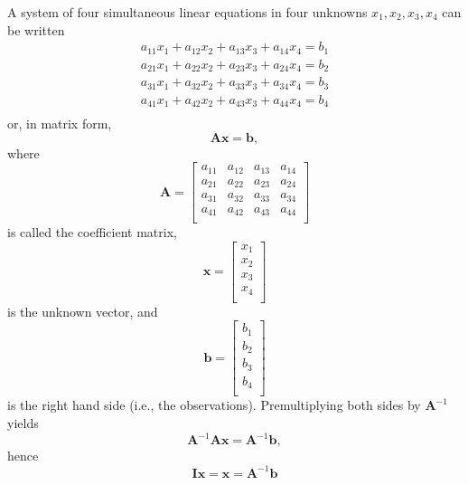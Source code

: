 A system of four simultaneous linear equations in four unknowns $x_1, x_2, x_3, x_4$ can be written
\begin{equation}
\begin{array}{c}
a_{11}x_1+a_{12}x_2+a_{13}x_3+a_{14}x_4=b_1\\
a_{21}x_1+a_{22}x_2+a_{23}x_3+a_{24}x_4=b_2\\
a_{31}x_1+a_{32}x_2+a_{33}x_3+a_{34}x_4=b_3\\
a_{41}x_1+a_{42}x_2+a_{43}x_3+a_{44}x_4=b_4\\
\end{array}
\end{equation}
or, in matrix form, 
\begin{equation}
\mathbf {Ax=b},
\end{equation}	 
where
\begin{equation}
\mathbf{A}=
\left[\begin{array}{cccc}
a_{11} & a_{12} & a_{13} & a_{14}\\	 
a_{21} & a_{22} & a_{23} & a_{24}\\
a_{31} & a_{32} & a_{33} & a_{34}\\
a_{41} & a_{42} & a_{43} & a_{44}\\	 
\end{array}
\right]
\end{equation}
is called the coefficient matrix,
\begin{equation}
\mathbf{x}= \left[\begin{array}{c}x_1\\x_2\\x_3\\x_4\\
\end{array}\right]
\end{equation}
is the unknown vector, and
\begin{equation}
\mathbf{b}=\left[\begin{array}{c}b_1\\b_2\\b_3\\b_4\\
\end{array}
\right]
\end{equation}
is the right hand side (i.e., the observations).  Premultiplying both sides by $\mathbf{A}^{-1}$ yields
\begin{equation}
\mathbf{A}^{-1}\mathbf{Ax}=\mathbf{A}^{-1}\mathbf{b},
\end{equation}	 
hence
\begin{equation}
\mathbf{Ix=x=A}^{-1}\mathbf{b}
\end{equation}	 
